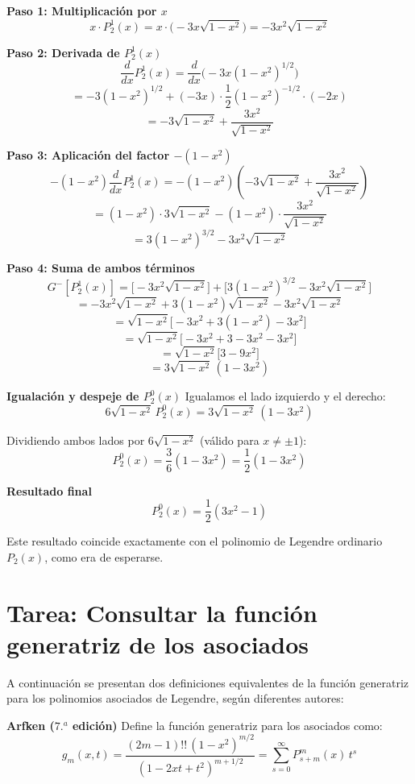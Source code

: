 \documentclass[a4paper]{article}
\begin{document}
\medskip
\textbf{Paso 1: Multiplicación por $x$}
$$
x \cdot P_2^1(x) = x \cdot \big( -3x \sqrt{1 - x^2} \big) = -3x^2 \sqrt{1 - x^2}
$$

\medskip
\textbf{Paso 2: Derivada de $P_2^1(x)$}
$$
\frac{d}{dx} P_2^1(x) = \frac{d}{dx} \big( -3x (1 - x^2)^{1/2} \big)
$$
$$
= -3 (1 - x^2)^{1/2} + (-3x) \cdot \frac{1}{2} (1 - x^2)^{-1/2} \cdot (-2x)
$$
$$
= -3 \sqrt{1 - x^2} + \frac{3x^2}{\sqrt{1 - x^2}}
$$

\medskip
\textbf{Paso 3: Aplicación del factor $-(1 - x^2)$}
$$
- (1 - x^2) \frac{d}{dx} P_2^1(x) = - (1 - x^2) \left( -3 \sqrt{1 - x^2} + \frac{3x^2}{\sqrt{1 - x^2}} \right)
$$
$$
= (1 - x^2) \cdot 3 \sqrt{1 - x^2} - (1 - x^2) \cdot \frac{3x^2}{\sqrt{1 - x^2}}
$$
$$
= 3 (1 - x^2)^{3/2} - 3x^2 \sqrt{1 - x^2}
$$

\medskip
\textbf{Paso 4: Suma de ambos términos}
$$
G^-[P_2^1(x)] = \big[ -3x^2 \sqrt{1 - x^2} \big] + \big[ 3 (1 - x^2)^{3/2} - 3x^2 \sqrt{1 - x^2} \big]
$$
$$
= -3x^2 \sqrt{1 - x^2} + 3 (1 - x^2) \sqrt{1 - x^2} - 3x^2 \sqrt{1 - x^2}
$$
$$
= \sqrt{1 - x^2} \big[ -3x^2 + 3(1 - x^2) - 3x^2 \big]
$$
$$
= \sqrt{1 - x^2} \big[ -3x^2 + 3 - 3x^2 - 3x^2 \big]
$$
$$
= \sqrt{1 - x^2} \big[ 3 - 9x^2 \big]
$$
$$
= 3 \sqrt{1 - x^2} \, (1 - 3x^2)
$$

\textbf{Igualación y despeje de $P_2^0(x)$}
Igualamos el lado izquierdo y el derecho:
$$
6 \sqrt{1 - x^2} \, P_2^0(x) = 3 \sqrt{1 - x^2} \, (1 - 3x^2)
$$

Dividiendo ambos lados por $6 \sqrt{1 - x^2}$ (válido para $x \neq \pm 1$):
$$
P_2^0(x) = \frac{3}{6} (1 - 3x^2) = \frac{1}{2} (1 - 3x^2)
$$

\textbf{Resultado final}
$$
\boxed{P_2^0(x) = \frac{1}{2} (3x^2 - 1)}
$$

Este resultado coincide exactamente con el polinomio de Legendre ordinario $P_2(x)$, como era de esperarse.

\section{Tarea: Consultar la función generatriz de los asociados}

A continuación se presentan dos definiciones equivalentes de la función generatriz para los polinomios asociados de Legendre, según diferentes autores:

\textbf{Arfken ($7.^a$ edición)}
Define la función generatriz para los asociados como:
$$
g_m(x, t) = \frac{(2m - 1)!! \, (1 - x^2)^{m/2}}{(1 - 2xt + t^2)^{m+1/2}} = \sum_{s=0}^\infty P_{s+m}^m(x) \, t^s
$$
\end{document}
